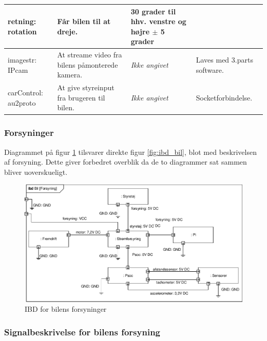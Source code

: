 \begin{table}[h]
\begin{tabularx}{\textwidth}{|l|Z|Z|Z|}
retning: rotation
	& Får bilen til at dreje.
	& 30 grader til hhv. venstre og højre $\pm$ 5 grader
	& ~
	\\ \hline
	
imagestr: IPcam
	& At streame video fra bilens påmonterede kamera.
	& \textit{Ikke angivet} 
	& Laves med 3.parts software.
	\\ \hline

carControl: au2proto
	& At give styreinput fra brugeren til bilen.
	& \textit{Ikke angivet} 
	& Socketforbindelse.
	\\ \hline

	\end{tabularx}
	\label{tbl:bil_signaler}
\end{table}

\clearpage

\subsubsection{Forsyninger} %

Diagrammet på figur \ref{fig:ibd_bil_forsyning} tilsvarer direkte figur \ref{fig:ibd_bil}, blot med beskrivelsen af forsyning. Dette giver forbedret overblik da de to diagrammer sat sammen bliver uoverskueligt.  

\begin{figure}[h]
\centering
\includegraphics[width=\textwidth]{../fig/diagrammer/bil/ibd_bil_forsyning.pdf}
\caption{IBD for bilens forsyninger}
\label{fig:ibd_bil_forsyning}
\end{figure}

\clearpage

\subsubsection{Signalbeskrivelse for bilens forsyning}


